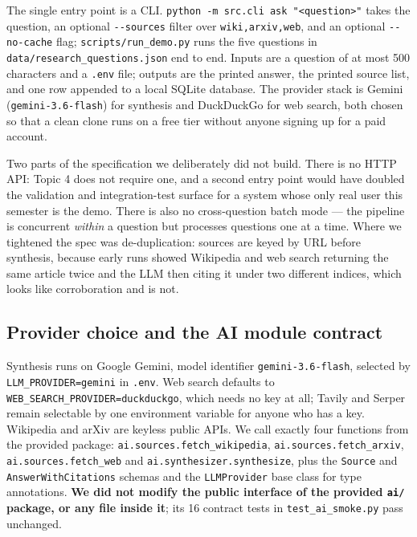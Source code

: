 \documentclass[11pt,a4paper]{article}
\begin{document}
The single entry point is a CLI. \texttt{python -m src.cli ask "<question>"} takes the question,
an optional \texttt{-{}-sources} filter over \texttt{wiki,arxiv,web}, and an optional
\texttt{-{}-no-cache} flag; \texttt{scripts/run\_demo.py} runs the five questions in
\texttt{data/research\_questions.json} end to end. Inputs are a question of at most 500
characters and a \texttt{.env} file; outputs are the printed answer, the printed source list,
and one row appended to a local SQLite database. The provider stack is Gemini
(\texttt{gemini-3.6-flash}) for synthesis and DuckDuckGo for web search, both chosen so that a
clean clone runs on a free tier without anyone signing up for a paid account.

Two parts of the specification we deliberately did not build. There is no HTTP API: Topic 4 does
not require one, and a second entry point would have doubled the validation and
integration-test surface for a system whose only real user this semester is the demo. There is
also no cross-question batch mode --- the pipeline is concurrent \emph{within} a question but
processes questions one at a time. Where we tightened the spec was de-duplication: sources are
keyed by URL before synthesis, because early runs showed Wikipedia and web search returning the
same article twice and the LLM then citing it under two different indices, which looks like
corroboration and is not.

\subsection{Provider choice and the AI module contract}

Synthesis runs on Google Gemini, model identifier \texttt{gemini-3.6-flash}, selected by
\texttt{LLM\_PROVIDER=gemini} in \texttt{.env}. Web search defaults to
\texttt{WEB\_SEARCH\_PROVIDER=duckduckgo}, which needs no key at all; Tavily and Serper remain
selectable by one environment variable for anyone who has a key. Wikipedia and arXiv are
keyless public APIs. We call exactly four functions from the provided package:
\texttt{ai.sources.fetch\_wikipedia}, \texttt{ai.sources.fetch\_arxiv},
\texttt{ai.sources.fetch\_web} and \texttt{ai.synthesizer.synthesize}, plus the
\texttt{Source} and \texttt{AnswerWithCitations} schemas and the \texttt{LLMProvider} base
class for type annotations. \textbf{We did not modify the public interface of the provided
\texttt{ai/} package, or any file inside it}; its 16 contract tests in
\texttt{test\_ai\_smoke.py} pass unchanged.
\end{document}
